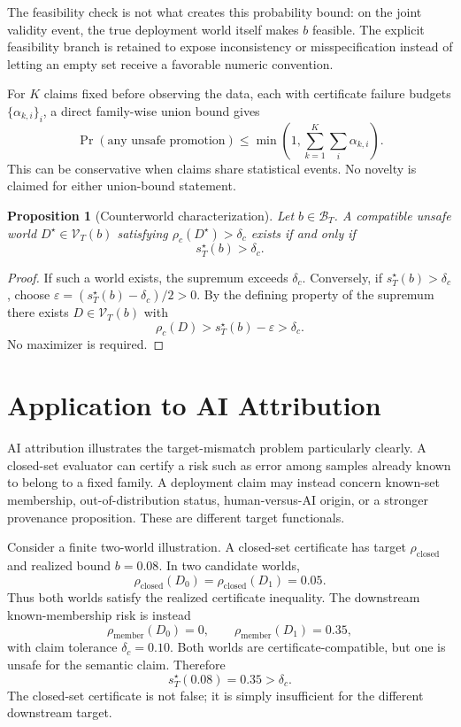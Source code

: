 \documentclass[10pt]{article}
\newtheorem{proposition}[definition]{Proposition}
\newcommand{\Vk}{\mathcal V_T}
\newcommand{\BT}{\mathcal B_T}
\newcommand{\riskc}{\rho_c}
\begin{document}
The feasibility check is not what creates this probability bound: on the joint
validity event, the true deployment world itself makes \(b\) feasible.  The
explicit feasibility branch is retained to expose inconsistency or
misspecification instead of letting an empty set receive a favorable numeric
convention.

For \(K\) claims fixed before observing the data, each with certificate
failure budgets \(\{\alpha_{k,i}\}_i\), a direct family-wise union bound
gives
\[
\Pr(\text{any unsafe promotion})
\le
\min\!\left(1,\sum_{k=1}^{K}\sum_i\alpha_{k,i}\right).
\]
This can be conservative when claims share statistical events.  No novelty is
claimed for either union-bound statement.

\begin{proposition}[Counterworld characterization]
Let \(b\in\BT\).  A compatible unsafe world
\(D^\star\in\Vk(b)\) satisfying \(\riskc(D^\star)>\delta_c\) exists
if and only if
\[
s_T^\star(b)>\delta_c.
\]
\end{proposition}

\begin{proof}
If such a world exists, the supremum exceeds \(\delta_c\).  Conversely, if
\(s_T^\star(b)>\delta_c\), choose
\(\varepsilon=(s_T^\star(b)-\delta_c)/2>0\).  By the defining property of
the supremum there exists \(D\in\Vk(b)\) with
\[
\riskc(D)>s_T^\star(b)-\varepsilon>\delta_c.
\]
No maximizer is required.
\end{proof}

\section{Application to AI Attribution}

AI attribution illustrates the target-mismatch problem particularly clearly.
A closed-set evaluator can certify a risk such as error among samples already
known to belong to a fixed family.  A deployment claim may instead concern
known-set membership, out-of-distribution status, human-versus-AI origin, or a
stronger provenance proposition.  These are different target functionals.

Consider a finite two-world illustration.  A closed-set certificate has
target \(\rho_{\mathrm{closed}}\) and realized bound \(b=0.08\).  In two
candidate worlds,
\[
\rho_{\mathrm{closed}}(D_0)
=
\rho_{\mathrm{closed}}(D_1)
=
0.05.
\]
Thus both worlds satisfy the realized certificate inequality.  The downstream
known-membership risk is instead
\[
\rho_{\mathrm{member}}(D_0)=0,
\qquad
\rho_{\mathrm{member}}(D_1)=0.35,
\]
with claim tolerance \(\delta_c=0.10\).  Both worlds are certificate-compatible,
but one is unsafe for the semantic claim.  Therefore
\[
s_T^\star(0.08)=0.35>\delta_c.
\]
The closed-set certificate is not false; it is simply insufficient for the
different downstream target.
\end{document}
